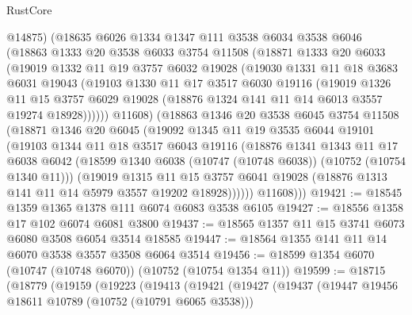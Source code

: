 \begin{lexlean}{RustCore}
\begin{coremodule}
        @14875)
      (@18635
        @6026
        @1334
        @1347
        @111
        @3538
        @6034
        @3538
        @6046
        (@18863
          @1333
          @20
          @3538
          @6033
          @3754
          @11508
          (@18871
            @1333
            @20
            @6033
            (@19019
              @1332
              @11
              @19
              @3757
              @6032
              @19028
              (@19030
                @1331
                @11
                @18
                @3683
                @6031
                @19043
                (@19103
                  @1330
                  @11
                  @17
                  @3517
                  @6030
                  @19116
                  (@19019
                    @1326
                    @11
                    @15
                    @3757
                    @6029
                    @19028
                    (@18876 @1324 @141 @11 @14 @6013 @3557 @19274 @18928))))))
          @11608)
        (@18863
          @1346
          @20
          @3538
          @6045
          @3754
          @11508
          (@18871
            @1346
            @20
            @6045
            (@19092
              @1345
              @11
              @19
              @3535
              @6044
              @19101
              (@19103
                @1344
                @11
                @18
                @3517
                @6043
                @19116
                (@18876
                  @1341
                  @1343
                  @11
                  @17
                  @6038
                  @6042
                  (@18599 @1340 @6038 (@10747 (@10748 @6038)) (@10752 (@10754 @1340 @11)))
                  (@19019
                    @1315
                    @11
                    @15
                    @3757
                    @6041
                    @19028
                    (@18876 @1313 @141 @11 @14 @5979 @3557 @19202 @18928))))))
          @11608)))
@19421 := @18545 @1359 @1365 @1378 @111 @6074 @6083 @3538 @6105
@19427 := @18556 @1358 @17 @102 @6074 @6081 @3800
@19437 := @18565 @1357 @11 @15 @3741 @6073 @6080 @3508 @6054 @3514 @18585
@19447 := @18564 @1355 @141 @11 @14 @6070 @3538 @3557 @3508 @6064 @3514
@19456 := @18599 @1354 @6070 (@10747 (@10748 @6070)) (@10752 (@10754 @1354 @11))
@19599 := @18715
    (@18779
      (@19159
        (@19223
          (@19413
            (@19421
              (@19427
                (@19437
                  (@19447 @19456 @18611 @10789 (@10752 (@10791 @6065 @3538)))

\end{coremodule}
\end{lexlean}
